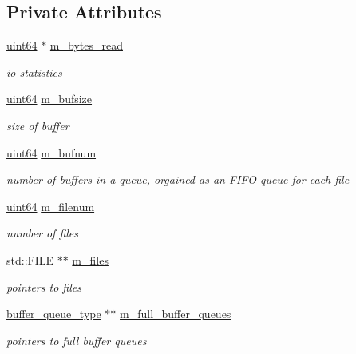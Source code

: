 \subsection*{Private Attributes}
\begin{DoxyCompactItemize}
\item 
\hyperlink{types_8h_a60e8696a4678cd348e991a1f172e53f7}{uint64} $\ast$ \hyperlink{classasync__multi__stream__reader_a6486d4f10a3caf9169018d2bb71c4fdc}{m\+\_\+bytes\+\_\+read}
\begin{DoxyCompactList}\small\item\em io statistics \end{DoxyCompactList}\item 
\hyperlink{types_8h_a60e8696a4678cd348e991a1f172e53f7}{uint64} \hyperlink{classasync__multi__stream__reader_a4ddb169d2f5eff8499eef88ba091c566}{m\+\_\+bufsize}
\begin{DoxyCompactList}\small\item\em size of buffer \end{DoxyCompactList}\item 
\hyperlink{types_8h_a60e8696a4678cd348e991a1f172e53f7}{uint64} \hyperlink{classasync__multi__stream__reader_a24bef59afd1ef00b27d54e00a5f1c39a}{m\+\_\+bufnum}
\begin{DoxyCompactList}\small\item\em number of buffers in a queue, orgained as an F\+I\+FO queue for each file \end{DoxyCompactList}\item 
\hyperlink{types_8h_a60e8696a4678cd348e991a1f172e53f7}{uint64} \hyperlink{classasync__multi__stream__reader_aa8447afd5b6caafe60f2c69be4df23ff}{m\+\_\+filenum}
\begin{DoxyCompactList}\small\item\em number of files \end{DoxyCompactList}\item 
std\+::\+F\+I\+LE $\ast$$\ast$ \hyperlink{classasync__multi__stream__reader_a9e79f443dd594c3ea539aa97d3f8cb45}{m\+\_\+files}
\begin{DoxyCompactList}\small\item\em pointers to files \end{DoxyCompactList}\item 
\hyperlink{classasync__multi__stream__reader_a0bf4b801f7d874da5cbbe5c6504d0ecc}{buffer\+\_\+queue\+\_\+type} $\ast$$\ast$ \hyperlink{classasync__multi__stream__reader_a57291593ed44d4c1d2586a438bb4d0d6}{m\+\_\+full\+\_\+buffer\+\_\+queues}
\begin{DoxyCompactList}\small\item\em pointers to full buffer queues \end{DoxyCompactList}\item 

\end{DoxyCompactItemize}
